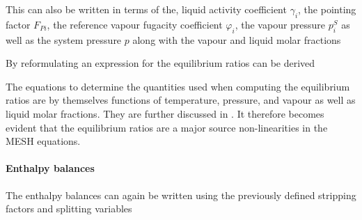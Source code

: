         This can also be written in terms of the, liquid activity coefficient $\gamma_i$,
        the pointing factor $F_{Pi}$, the reference vapour fugacity coefficient $\varphi_i$,
        the vapour pressure $p^S_i$ as well as the system pressure $p$ along with the vapour and
        liquid molar fractions

        By reformulating  an expression for the equilibrium ratios
        can be derived

        The equations to determine the quantities used when computing the equilibrium ratios are by
        themselves functions of temperature, pressure, and vapour as well as liquid molar fractions.
        They are further discussed in . It therefore becomes evident that the
        equilibrium ratios are a major source  non-linearities in the MESH equations.

	\paragraph{Enthalpy balances}
        The enthalpy balances can again be written using the previously defined stripping factors
        and splitting variables

